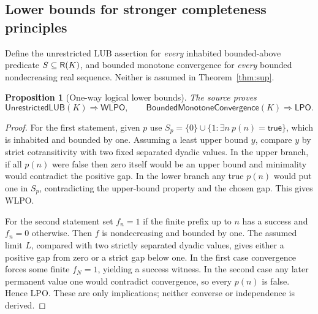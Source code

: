\documentclass[11pt,reqno]{amsart}
\newtheorem{proposition}[theorem]{Proposition}
\theoremstyle{definition}\newtheorem{definition}[theorem]{Definition}
\theoremstyle{remark}\newtheorem{remark}[theorem]{Remark}
\begin{document}
\subsection{Lower bounds for stronger completeness principles}\label{main:sub-55}
Define the unrestricted LUB assertion for \emph{every} inhabited bounded-above predicate $S\subseteq\mathsf R(K)$, and bounded monotone convergence for \emph{every} bounded nondecreasing real sequence. Neither is assumed in Theorem~\ref{thm:sup}.
\begin{proposition}[One-way logical lower bounds]\label{prop:lowerbounds}
The source proves
\[
\mathsf{UnrestrictedLUB}(K)\Longrightarrow\mathsf{WLPO},\qquad
\mathsf{BoundedMonotoneConvergence}(K)\Longrightarrow\mathsf{LPO}.
\]
\end{proposition}
\begin{proof}
For the first statement, given $p$ use $S_p=\{0\}\cup\{1:\exists n\ p(n)=\mathsf{true}\}$, which is inhabited and bounded by one. Assuming a least upper bound $y$, compare $y$ by strict cotransitivity with two fixed separated dyadic values. In the upper branch, if all $p(n)$ were false then zero itself would be an upper bound and minimality would contradict the positive gap. In the lower branch any true $p(n)$ would put one in $S_p$, contradicting the upper-bound property and the chosen gap. This gives WLPO.

For the second statement set $f_n=1$ if the finite prefix up to $n$ has a success and $f_n=0$ otherwise. Then $f$ is nondecreasing and bounded by one. The assumed limit $L$, compared with two strictly separated dyadic values, gives either a positive gap from zero or a strict gap below one. In the first case convergence forces some finite $f_N=1$, yielding a success witness. In the second case any later permanent value one would contradict convergence, so every $p(n)$ is false. Hence LPO. These are only implications; neither converse or independence is derived.
\end{proof}


\medskip
\end{document}
